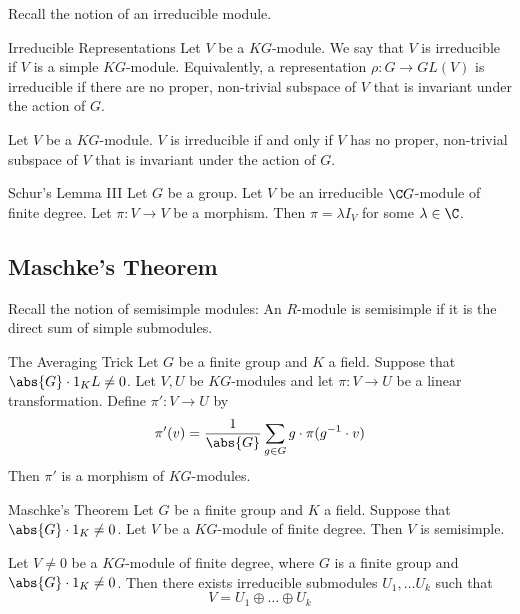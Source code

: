 \documentclass[a4paper]{article}
\begin{document}
Recall the notion of an irreducible module. 

\begin{defn}{Irreducible Representations}{} Let $V$ be a $KG$-module. We say that $V$ is irreducible if $V$ is a simple $KG$-module. Equivalently, a representation $\rho:G\to GL(V)$ is irreducible if there are no proper, non-trivial subspace of $V$ that is invariant under the action of $G$. 
\end{defn}

\begin{prp}{}{} Let $V$ be a $KG$-module. $V$ is irreducible if and only if $V$ has no proper, non-trivial subspace of $V$ that is invariant under the action of $G$. 
\end{prp}

\begin{thm}{Schur's Lemma III}{} Let $G$ be a group. Let $V$ be an irreducible $\C G$-module of finite degree. Let $\pi:V\to V$ be a morphism. Then $\pi=\lambda I_V$ for some $\lambda\in\C$. 
\end{thm}

\subsection{Maschke's Theorem}
Recall the notion of semisimple modules: An $R$-module is semisimple if it is the direct sum of simple submodules. 

\begin{lmm}{The Averaging Trick}{} Let $G$ be a finite group and $K$ a field. Suppose that $\abs{G}\cdot 1_KL\neq 0$. Let $V,U$ be $KG$-modules and let $\pi:V\to U$ be a linear transformation. Define $\pi':V\to U$ by $$\pi'(v)=\frac{1}{\abs{G}}\sum_{g\in G}g\cdot\pi(g^{-1}\cdot v)$$ Then $\pi'$ is a morphism of $KG$-modules. 
\end{lmm}

\begin{thm}{Maschke's Theorem}{} Let $G$ be a finite group and $K$ a field. Suppose that $\abs{G}\cdot 1_K\neq 0$. Let $V$ be a $KG$-module of finite degree. Then $V$ is semisimple. 
\end{thm}

\begin{crl}{}{} Let $V\neq 0$ be a $KG$-module of finite degree, where $G$ is a finite group and $\abs{G}\cdot 1_K\neq 0$. Then there exists irreducible submodules $U_1,\dots U_k$ such that $$V=U_1\oplus\dots\oplus U_k$$
\end{crl}
\end{document}
